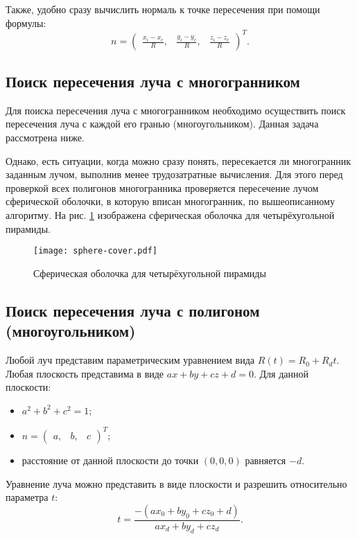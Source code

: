 Также, удобно сразу вычислить нормаль к точке пересечения при помощи формулы:
\begin{equation}
	n = \begin{pmatrix}
		\frac{x_i - x_c}{R}, & \frac{y_i - y_c}{R}, & \frac{z_i - z_c}{R}
	\end{pmatrix}^{T}.
\end{equation}

\subsection{Поиск пересечения луча с многогранником}
Для поиска пересечения луча с многогранником необходимо осуществить поиск пересечения луча с каждой его гранью (многоугольником). Данная задача рассмотрена ниже.

Однако, есть ситуации, когда можно сразу понять, пересекается ли многогранник заданным лучом, выполнив менее трудозатратные вычисления. Для этого перед проверкой всех полигонов многогранника проверяется пересечение лучом сферической оболочки, в которую вписан многогранник, по вышеописанному алгоритму. На рис. \ref{img:sphere-cover} изображена сферическая оболочка для четырёхугольной пирамиды.

\begin{figure}[h!]
    \centering
    \texttt{[image: sphere-cover.pdf]}
    \caption{Сферическая оболочка для четырёхугольной пирамиды}
    \label{img:sphere-cover}
\end{figure}

\newpage

\subsection{Поиск пересечения луча с полигоном (многоугольником)}
Любой луч представим параметрическим уравнением вида $R(t) = R_0 + R_dt$. Любая плоскость представима в виде $ax + by + cz + d = 0$. Для данной плоскости: \begin{itemize}
	\item $a^2 + b^2 + c^2 = 1$;
	\item $n = \begin{pmatrix}
		a, & b, & c \end{pmatrix}^{T}$;
	\item расстояние от данной плоскости до точки $(0,0,0)$ равняется $-d$.
\end{itemize}

Уравнение луча можно представить в виде плоскости и разрешить относительно параметра $t$:
\begin{equation}
	t = \frac{-(ax_0 + by_0 + cz_0 + d)}{ax_d + by_d + cz_d}.
\end{equation}

